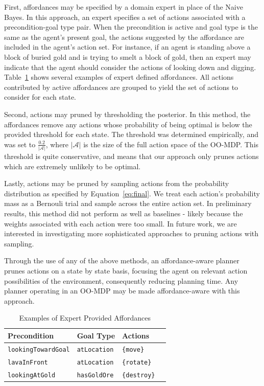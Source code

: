 \documentclass[letterpaper]{article}
\newcommand{\ra}[1]{\renewcommand{\arraystretch}{#1}} %
\begin{document}
First, affordances may be specified by a domain expert in place of the Naive Bayes. In this approach,
an expert specifies a set of actions associated with a
precondition-goal type pair. When the precondition is active and goal type is the same
as the agent's present goal, the actions suggested by the affordance are included
in the agent's action set. For instance, if an agent is standing
above a block of buried gold and is trying to smelt a block of gold,
then an expert may indicate that the agent should consider the actions
of looking down and digging. Table~\ref{table:afford_kb_exp} shows several examples of expert
defined affordances. All actions contributed by active affordances are
grouped to yield the set of actions to consider for each state.

Second, actions may pruned by thresholding the posterior.
In this method, the affordances remove any
actions whose probability of being optimal is below the provided
threshold for each state. The threshold was determined empirically, and was set to
$\frac{0.2}{|\mathcal{A}|}$, where $|\mathcal{A}|$ is the size of the
full action space of the OO-MDP.  This threshold is quite
conservative, and means that our approach only prunes actions which
are extremely unlikely to be optimal.

Lastly, actions may be pruned by sampling actions from the
probability distribution as specified by
Equation~\ref{eq:final}. We treat each action's probability mass as a
Bernouli trial and sample across the entire action set. In preliminary
results, this method did not perform as well as baselines - likely
because the weights associated with each action were too small. In
future work, we are interested in investigating more sophisticated
approaches to pruning actions with sampling.

Through the use of any of the above methods, an affordance-aware
planner prunes actions on a state by state basis, focusing the agent
on relevant action possibilities of the environment, consequently
reducing planning time. Any planner operating in an OO-MDP may be made
affordance-aware with this approach.

\begin{table}[b]
\ra{1.35}
\begin{tabular}{@{}llll@{}}\toprule
Precondition & Goal Type & Actions \\ \midrule
\texttt{lookingTowardGoal} & \texttt{atLocation} & \texttt{\{move\}} \\
\texttt{lavaInFront} & \texttt{atLocation} & \texttt{\{rotate\}} \\
\texttt{lookingAtGold} & \texttt{hasGoldOre} & \texttt{\{destroy\}} \\
\bottomrule
\end{tabular}

\caption{Examples of Expert Provided Affordances\label{table:afford_kb_exp}}
\end{table}
\end{document}
